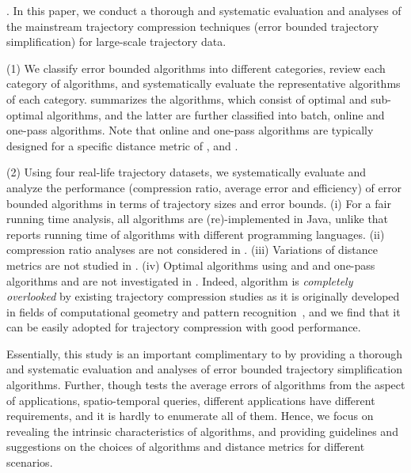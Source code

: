 




.
In this paper, we conduct a thorough and systematic evaluation and analyses of the mainstream trajectory compression techniques (\ie error bounded trajectory simplification) for large-scale trajectory data.

\stab (1) We classify error bounded \lsa algorithms into different categories, review each category of algorithms, and systematically evaluate the representative algorithms of each category.
%
 summarizes the algorithms, which consist of optimal and sub-optimal algorithms, and the latter are further classified into batch, online and one-pass algorithms.
Note that online and one-pass algorithms are typically designed for a specific distance metric of \ped, \sed and \dad.

\stab (2) Using four real-life trajectory datasets, we systematically evaluate and analyze the performance (compression ratio, average error and efficiency) of error bounded \lsa algorithms in terms of trajectory sizes and error bounds.
%
(i) For a fair running time analysis, all algorithms are (re)-implemented in Java, unlike \cite{Zhang:Evaluation} that reports running time of algorithms with different programming languages. (ii) compression ratio analyses are not considered in \cite{Zhang:Evaluation}.
(iii) Variations of distance metrics are not studied in \cite{Zhang:Evaluation}.
(iv) Optimal algorithms using \ped and \sed and one-pass algorithms \siped and \cised are not investigated in \cite{Zhang:Evaluation}. Indeed, algorithm \siped is {\em completely overlooked} by existing trajectory compression studies as it is originally developed in fields of computational geometry and pattern recognition~\cite{Williams:Longest,Sklansky:Cone,Dunham:Cone, Zhao:Sleeve}, and we find that it can be easily adopted for trajectory compression with good performance.


Essentially, this study is an important complimentary to \cite{Zhang:Evaluation} by providing a thorough and systematic evaluation and analyses of error bounded trajectory simplification algorithms. Further, though  \cite{Zhang:Evaluation} tests the average errors of algorithms from the aspect of applications, \ie spatio-temporal queries, different applications have different requirements, and it is hardly to enumerate all of them. Hence, we focus on revealing the intrinsic characteristics of algorithms, and providing guidelines and suggestions on the choices of algorithms and distance metrics for different scenarios.






